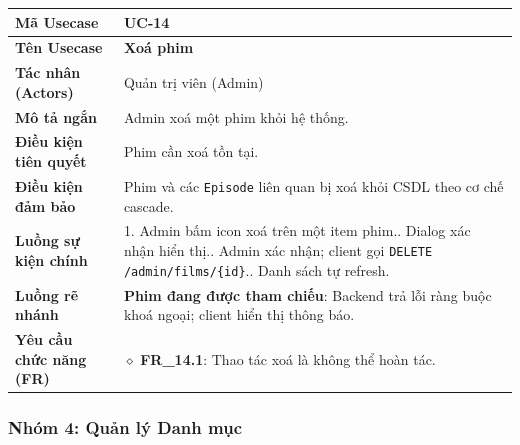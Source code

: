 \begin{table}[H]
\renewcommand{\arraystretch}{1.3}
\centering
\begin{tabularx}{\textwidth}{|p{4.5cm}|X|}
\hline
\cellcolor{gray!15}\bfseries Mã Usecase & \textbf{UC-14} \\ \hline
\cellcolor{gray!15}\bfseries Tên Usecase & \textbf{Xoá phim} \\ \hline
\cellcolor{gray!15}\bfseries Tác nhân (Actors) & Quản trị viên (Admin) \\ \hline
\cellcolor{gray!15}\bfseries Mô tả ngắn & Admin xoá một phim khỏi hệ thống. \\ \hline
\cellcolor{gray!15}\bfseries Điều kiện tiên quyết & Phim cần xoá tồn tại. \\ \hline
\cellcolor{gray!15}\bfseries Điều kiện đảm bảo & Phim và các \texttt{Episode} liên quan bị xoá khỏi CSDL theo cơ chế cascade. \\ \hline
\cellcolor{gray!15}\bfseries Luồng sự kiện chính & 1. Admin bấm icon xoá trên một item phim.\newline 2. Dialog xác nhận hiển thị.\newline 3. Admin xác nhận; client gọi \texttt{DELETE /admin/films/\{id\}}.\newline 4. Danh sách tự refresh. \\ \hline
\cellcolor{gray!15}\bfseries Luồng rẽ nhánh & \textbf{Phim đang được tham chiếu}: Backend trả lỗi ràng buộc khoá ngoại; client hiển thị thông báo. \\ \hline
\cellcolor{gray!15}\bfseries Yêu cầu chức năng (FR) & $\diamond$ \textbf{FR\_14.1}: Thao tác xoá là không thể hoàn tác. \\ \hline
\end{tabularx}
\end{table}


\subsubsection*{Nhóm 4: Quản lý Danh mục}


